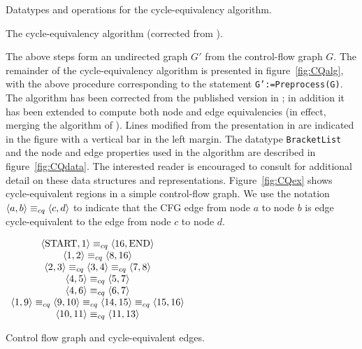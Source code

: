 \documentclass[12pt,titlepage]{article}
\begin{document}
\begin{myfigure}\small
\caption{Datatypes and operations for the cycle-equivalency algorithm.}
\label{fig:CQdata}\end{myfigure}

\begin{myfigure}\small\linespread{0.75}
\caption{The cycle-equivalency algorithm
	 (corrected from \cite{johnson93:sese}).}
\label{fig:CQalg}\end{myfigure}

The above steps form an undirected graph $G'$ from the control-flow
graph $G$.  The remainder of the cycle-equivalency algorithm is
presented in figure~\vref{fig:CQalg}, with the above procedure
corresponding to the statement \texttt{G':=Preprocess(G)}.  The
algorithm has been corrected from the published version in
\cite{johnson93:sese}; in addition it has been extended to compute
both node and edge equivalencies (in effect, merging the algorithm of
\cite{johnson94:pst}).  Lines modified from the presentation in
\cite{johnson93:sese} are indicated in the figure with a vertical bar
in the left margin.  The datatype \texttt{BracketList} and the node
and edge properties used in the algorithm are described in
figure~\vref{fig:CQdata}.  The interested reader is encouraged to consult
\cite{johnson93:sese} for additional detail on these data structures
and representations.%
Figure~\vref{fig:CQex} shows cycle-equivalent regions in a simple
control-flow graph.  We use the notation
$\left\langle a,b \right\rangle\equiv_{cq}\left\langle c,d \right\rangle$ to indicate that the CFG edge from node
$a$ to node $b$ is edge cycle-equivalent to the edge from node $c$ to
node $d$.

\begin{myfigure}\centering
\vertcenter{}
$\begin{array}[c]{cc}
\left\langle \text{START},1 \right\rangle\equiv_{cq}\left\langle 16,\text{END} \right\rangle\\
\left\langle 1,2 \right\rangle\equiv_{cq}\left\langle 8,16 \right\rangle\\
\left\langle 2,3 \right\rangle\equiv_{cq}\left\langle 3,4 \right\rangle\equiv_{cq}\left\langle 7,8 \right\rangle\\
\left\langle 4,5 \right\rangle\equiv_{cq}\left\langle 5,7 \right\rangle\\
\left\langle 4,6 \right\rangle\equiv_{cq}\left\langle 6,7 \right\rangle\\
\left\langle 1,9 \right\rangle\equiv_{cq}\left\langle 9,10 \right\rangle\equiv_{cq}\left\langle 14,15 \right\rangle\equiv_{cq}\left\langle 15,16 \right\rangle\\
\left\langle 10,11 \right\rangle\equiv_{cq}\left\langle 11,13 \right\rangle\\
\end{array}$
\caption{Control flow graph and cycle-equivalent edges.}
\label{fig:CQex}\end{myfigure}
\end{document}
